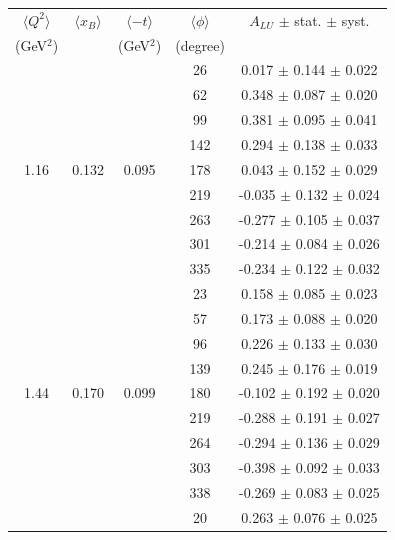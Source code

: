 \documentclass[aps,prc,preprint,superscriptaddress]{revtex4}
\begin{document}
\begin{table}[!h]
   \begin{center}
      \begin{tabular}{|c|c|c|c|c|}
         \hline
 $\langle Q^{2} \rangle$ & $\langle x_{B} \rangle$ & $\langle -t \rangle$ & $\langle \phi \rangle$ & $A_{LU}$ $\pm$ stat. $\pm$ syst.\\
 (GeV$^{2}$) &           & (GeV$^{2}$) & (degree) &  \\
         \hline

        &       &       &  26   &  0.017  $\pm$ 0.144  $\pm$ 0.022  \\
        &       &       &  62   &  0.348  $\pm$ 0.087  $\pm$ 0.020  \\
        &       &       &  99   &  0.381  $\pm$ 0.095  $\pm$ 0.041  \\
        &       &       & 142   &  0.294  $\pm$ 0.138  $\pm$ 0.033  \\
  1.16  & 0.132 & 0.095 & 178   &  0.043  $\pm$ 0.152  $\pm$ 0.029  \\
        &       &       & 219   & -0.035  $\pm$ 0.132  $\pm$ 0.024  \\
        &       &       & 263   & -0.277  $\pm$ 0.105  $\pm$ 0.037  \\
        &       &       & 301   & -0.214  $\pm$ 0.084  $\pm$ 0.026  \\
        &       &       & 335   & -0.234  $\pm$ 0.122  $\pm$ 0.032  \\
   \hline 
        &       &       &   23  &  0.158  $\pm$ 0.085  $\pm$ 0.023  \\
        &       &       &   57  &  0.173  $\pm$ 0.088  $\pm$ 0.020  \\
        &       &       &   96  &  0.226  $\pm$ 0.133  $\pm$ 0.030  \\
        &       &       &  139  &  0.245  $\pm$ 0.176  $\pm$ 0.019  \\
  1.44  & 0.170 & 0.099 &  180  & -0.102  $\pm$ 0.192  $\pm$ 0.020  \\
        &       &       &  219  & -0.288  $\pm$ 0.191  $\pm$ 0.027  \\
        &       &       &  264  & -0.294  $\pm$ 0.136  $\pm$ 0.029  \\
        &       &       &  303  & -0.398  $\pm$ 0.092  $\pm$ 0.033  \\
        &       &       &  338  & -0.269  $\pm$ 0.083  $\pm$ 0.025  \\
   \hline 
        &       &       &  20   &  0.263  $\pm$ 0.076  $\pm$ 0.025  \\

\end{tabular}
\end{center}
\end{table}
\end{document}
